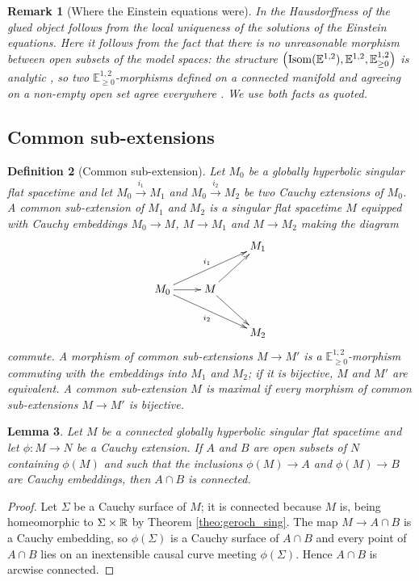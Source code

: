 \documentclass[a4paper,twoside]{article}
\newcommand{\mass}[1]{\mathbb{E}^{1,2}_{#1}}
\newtheorem{lem}{Lemma}[section]
\newtheorem{defi}[lem]{Definition}
\newtheorem{rem}[lem]{Remark}
\begin{document}
\begin{rem}[Where the Einstein equations were]\label{rem:CBG_analytique}
In \cite{MR0250640} the Hausdorffness of the glued object follows from the local uniqueness of the
solutions of the Einstein equations. Here it follows from the fact that there is no unreasonable
morphism between open subsets of the model spaces: the structure
$\left(\isom(\mass{}),\mass{},\mass{\geq0}\right)$ is analytic \cite[Prop.~2.3.14]{thesis}, so two
$\mass{\geq0}$-morphisms defined on a connected manifold and agreeing on a non-empty open set agree
everywhere \cite[Prop.~1.2.11]{thesis}. We use both facts as quoted.
\end{rem}

\subsection{Common sub-extensions}\label{subsec:CBG_pgcd}

\begin{defi}[Common sub-extension]
Let $M_0$ be a globally hyperbolic singular flat spacetime and let $M_0\xrightarrow{i_1} M_1$ and
$M_0\xrightarrow{i_2} M_2$ be two Cauchy extensions of $M_0$. A \emph{common sub-extension} of $M_1$
and $M_2$ is a singular flat spacetime $M$ equipped with Cauchy embeddings $M_0\rightarrow M$,
$M\rightarrow M_1$ and $M\rightarrow M_2$ making the diagram
$$
	\xymatrix{
		& &M_1\\
		M_0\ar[urr]^{i_1} \ar[drr]_{i_2}\ar[r]&M\ar[ur]\ar[dr]& \\
		&& M_2
	}
$$
commute. A morphism of common sub-extensions $M\rightarrow M'$ is a $\mass{\geq0}$-morphism
commuting with the embeddings into $M_1$ and $M_2$; if it is bijective, $M$ and $M'$ are
\emph{equivalent}. A common sub-extension $M$ is \emph{maximal} if every morphism of common
sub-extensions $M\rightarrow M'$ is bijective.
\end{defi}

\begin{lem}\label{lem:C_ext_connexe}
Let $M$ be a connected globally hyperbolic singular flat spacetime and let $\phi:M\rightarrow N$ be a
Cauchy extension. If $A$ and $B$ are open subsets of $N$ containing $\phi(M)$ and such that the
inclusions $\phi(M)\rightarrow A$ and $\phi(M)\rightarrow B$ are Cauchy embeddings, then $A\cap B$ is
connected.
\end{lem}
\begin{proof}
Let $\Sigma$ be a Cauchy surface of $M$; it is connected because $M$ is, being homeomorphic to
$\Sigma\times \mathbb R$ by Theorem \ref{theo:geroch_sing}. The map $M\rightarrow A\cap B$ is a Cauchy
embedding, so $\phi(\Sigma)$ is a Cauchy surface of $A\cap B$ and every point of $A\cap B$ lies on an
inextensible causal curve meeting $\phi(\Sigma)$. Hence $A\cap B$ is arcwise connected.
\end{proof}
\end{document}
